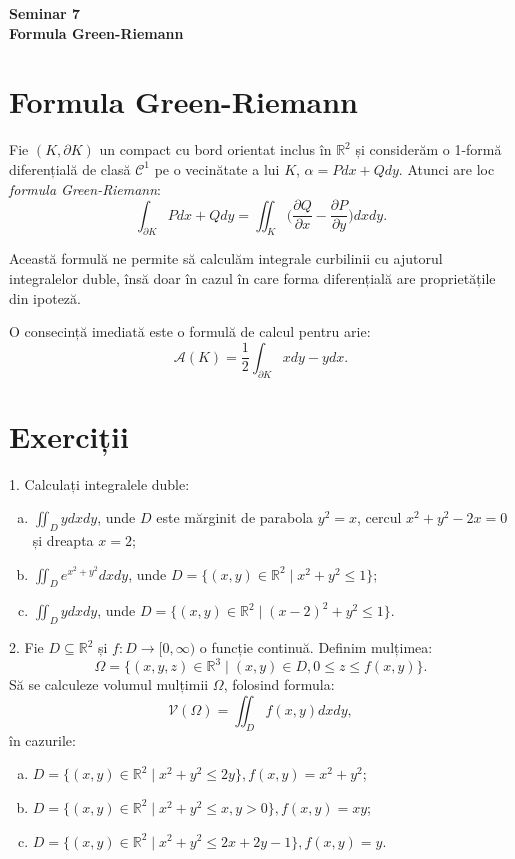 \documentclass[11pt,a4paper]{article}
\newcommand\kal{\mathcal}
\newcommand\ds{\displaystyle}
\newcommand\seq{\subseteq}
\newcommand\RR{\mathbb{R}}
\theoremstyle{dotless}
\theoremstyle{dotlessdr}
\begin{document}
\begin{center}
  {\large\textbf{Seminar 7 \\
      Formula Green-Riemann}}
\end{center}

\vspace{1cm}

\section{Formula Green-Riemann}

Fie $ (K, \partial K) $ un compact cu bord orientat inclus în $ \RR^2 $ și
considerăm o 1-formă diferențială de clasă $ \kal{C}^1 $ pe o vecinătate a lui $ K $,
$ \alpha = P dx + Q dy $.
Atunci are loc \emph{formula Green-Riemann}:
\[
  \int_{\partial K} Pdx + Qdy =
  \iint_K \Big( \frac{\partial Q}{\partial x} - \frac{\partial P}{\partial y} \Big) dxdy.
\]

Această formulă ne permite să calculăm integrale curbilinii cu ajutorul
integralelor duble, însă doar în cazul în care forma diferențială are proprietățile
din ipoteză.

O consecință imediată este o formulă de calcul pentru arie:
\[
  \kal{A}(K) = \frac{1}{2} \int_{\partial K} xdy - ydx.
\]


\section{Exerciții}

1. Calculați integralele duble:
\begin{enumerate}[(a)]
\item $ \ds\iint_D ydxdy $, unde $ D $ este mărginit de parabola $ y^2 = x $,
  cercul $ x^2 + y^2 - 2x = 0 $ și dreapta $ x = 2 $;
\item $ \ds\iint_D e^{x^2 + y^2} dxdy $, unde $ D = \{(x, y) \in \RR^2 \mid x^2 + y^2 \leq 1 \} $;
\item $ \ds\iint_D ydxdy $, unde $ D = \{(x, y) \in \RR^2 \mid (x - 2)^2 + y^2 \leq 1 \} $.
\end{enumerate}

\vspace{1cm}

2. Fie $ D \seq \RR^2 $ și $ f : D \to [0, \infty) $ o funcție continuă. Definim
mulțimea:
\[
  \Omega = \{ (x, y, z) \in \RR^3 \mid (x, y) \in D, 0 \leq z \leq f(x, y) \}.
\]
Să se calculeze volumul mulțimii $ \Omega $, folosind formula:
\[
  \kal{V}(\Omega) = \iint_D f(x, y) dxdy,
\]
în cazurile:
\begin{enumerate}[(a)]
\item $ D = \{(x, y) \in \RR^2 \mid x^2 + y^2 \leq 2y \}, f(x, y) = x^2 + y^2 $;
\item $ D = \{(x, y) \in \RR^2 \mid x^2 + y^2 \leq x, y > 0 \}, f(x, y) = xy $;
\item $ D = \{(x, y) \in \RR^2 \mid x^2 + y^2 \leq 2x + 2y - 1 \}, f(x, y) = y $.
\end{enumerate}
\end{document}

